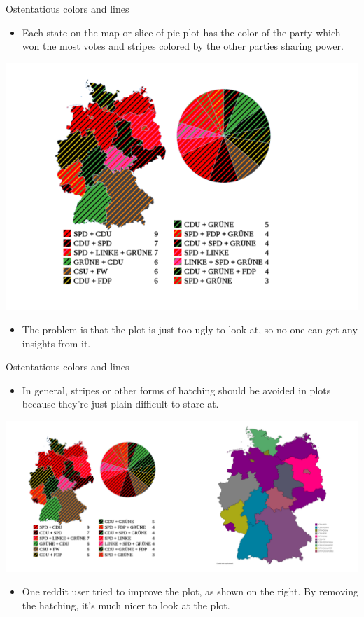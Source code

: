 \documentclass[
  ignorenonframetext,
]{beamer}
\providecommand{\tightlist}{%
  \setlength{\itemsep}{0pt}\setlength{\parskip}{0pt}}
\begin{document}
\begin{frame}{Ostentatious colors and lines}
\label{ostentatious-colors-and-lines-2}
\begin{itemize}
\tightlist
\item
  Each state on the map or slice of pie plot has the color of the party
  which won the most votes and stripes colored by the other parties
  sharing power.
\end{itemize}

\includegraphics{../images/im117.png}

\begin{itemize}
\tightlist
\item
  The problem is that the plot is just too ugly to look at, so no-one
  can get any insights from it.
\end{itemize}
\end{frame}

\begin{frame}{Ostentatious colors and lines}
\label{ostentatious-colors-and-lines-3}
\begin{itemize}
\tightlist
\item
  In general, stripes or other forms of hatching should be avoided in
  plots because they're just plain difficult to stare at.
\end{itemize}

\includegraphics{../images/im118.png}

\begin{itemize}
\tightlist
\item
  One reddit user tried to improve the plot, as shown on the right. By
  removing the hatching, it's much nicer to look at the plot.
\end{itemize}
\end{frame}
\end{document}
